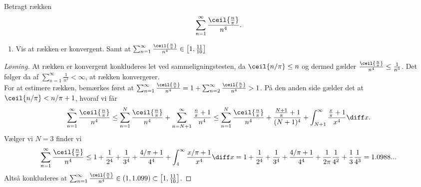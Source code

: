 \begin{opg}
		Betragt rækken $$ \sum_{n=1}^{\infty}\frac{\ceil{\frac{n}{\pi}}}{n^4}. $$
		\begin{enumerate}
			\item Vis at rækken er konvergent. Samt at $ \sum_{n=1}^{\infty}\frac{\ceil{\frac{n}{\pi}}}{n^4}\in\left[1,\frac{11}{10}\right] $	
		\end{enumerate}
		\ifanswers
		\begin{proof}[Løsning]
			At rækken er konvergent konkluderes let ved sammeligningstesten, da $ \ceil{n/\pi}\leq n $ og dermed gælder $ \frac{\ceil{\frac{n}{\pi}}}{n^4}\leq \frac{1}{n^3} $. Det følger da af $ \sum_{n=1}^{\infty}\frac{1}{n^3}<\infty $, at rækken konvergerer.\\
			For at estimere rækken, bemærkes først at $ \sum_{n=1}^{\infty}\frac{\ceil{\frac{n}{\pi}}}{n^4}=1+\sum_{n=2}^{\infty}\frac{\ceil{\frac{n}{\pi}}}{n^4}>1 $. På den anden side gælder det at $ \ceil{n/\pi}<n/\pi+1 $, hvoraf vi får \begin{equation*}
			\sum_{n=1}^{\infty}\frac{\ceil{\frac{n}{\pi}}}{n^4}\leq \sum_{n=1}^{N}\frac{\ceil{\frac{n}{\pi}}}{n^4}+\sum_{n=N+1}^{\infty}\frac{\frac{n}{\pi}+1}{n^4}\leq \sum_{n=1}^{N}\frac{\ceil{\frac{n}{\pi}}}{n^4}+\frac{\frac{N+1}{\pi}+1}{(N+1)^4}+\int_{N+1}^{\infty}\frac{\frac{x}{\pi}+1}{x^4}\diff x.
			\end{equation*}
			Vælger vi $ N=3 $ finder vi\begin{equation*}
			\sum_{n=1}^{\infty}\frac{\ceil{\frac{n}{\pi}}}{n^4}\leq 1+\frac{1}{2^4}+\frac{1}{3^4}+\frac{4/\pi+1}{4^4}+\int_{4}^{\infty}\frac{x/\pi+1}{x^4}\diff x=1+\frac{1}{2^4}+\frac{1}{3^4}+\frac{4/\pi+1}{4^4}+\frac{1}{2\pi}\frac{1}{4^2}+\frac{1}{3}\frac{1}{4^3}=1.0988...
			\end{equation*}
			Altså konkluderes at $\sum_{n=1}^{\infty}\frac{\ceil{\frac{n}{\pi}}}{n^4}\in(1,1.099)\subset\left[1,\frac{11}{10}\right]  $.
		\end{proof}
		\fi
\end{opg}

